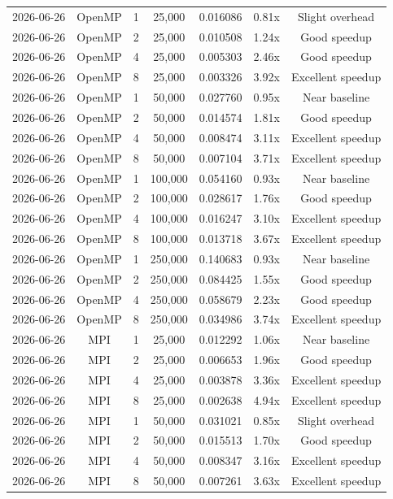 \documentclass[12pt]{article}
\begin{document}
\begin{longtable}{|c|c|c|c|c|c|c|}
2026-06-26 & OpenMP & 1 & 25,000 & 0.016086 & 0.81x & Slight overhead \\
2026-06-26 & OpenMP & 2 & 25,000 & 0.010508 & 1.24x & Good speedup \\
2026-06-26 & OpenMP & 4 & 25,000 & 0.005303 & 2.46x & Good speedup \\
2026-06-26 & OpenMP & 8 & 25,000 & 0.003326 & 3.92x & Excellent speedup \\
2026-06-26 & OpenMP & 1 & 50,000 & 0.027760 & 0.95x & Near baseline \\
2026-06-26 & OpenMP & 2 & 50,000 & 0.014574 & 1.81x & Good speedup \\
2026-06-26 & OpenMP & 4 & 50,000 & 0.008474 & 3.11x & Excellent speedup \\
2026-06-26 & OpenMP & 8 & 50,000 & 0.007104 & 3.71x & Excellent speedup \\
2026-06-26 & OpenMP & 1 & 100,000 & 0.054160 & 0.93x & Near baseline \\
2026-06-26 & OpenMP & 2 & 100,000 & 0.028617 & 1.76x & Good speedup \\
2026-06-26 & OpenMP & 4 & 100,000 & 0.016247 & 3.10x & Excellent speedup \\
2026-06-26 & OpenMP & 8 & 100,000 & 0.013718 & 3.67x & Excellent speedup \\
2026-06-26 & OpenMP & 1 & 250,000 & 0.140683 & 0.93x & Near baseline \\
2026-06-26 & OpenMP & 2 & 250,000 & 0.084425 & 1.55x & Good speedup \\
2026-06-26 & OpenMP & 4 & 250,000 & 0.058679 & 2.23x & Good speedup \\
2026-06-26 & OpenMP & 8 & 250,000 & 0.034986 & 3.74x & Excellent speedup \\
2026-06-26 & MPI & 1 & 25,000 & 0.012292 & 1.06x & Near baseline \\
2026-06-26 & MPI & 2 & 25,000 & 0.006653 & 1.96x & Good speedup \\
2026-06-26 & MPI & 4 & 25,000 & 0.003878 & 3.36x & Excellent speedup \\
2026-06-26 & MPI & 8 & 25,000 & 0.002638 & 4.94x & Excellent speedup \\
2026-06-26 & MPI & 1 & 50,000 & 0.031021 & 0.85x & Slight overhead \\
2026-06-26 & MPI & 2 & 50,000 & 0.015513 & 1.70x & Good speedup \\
2026-06-26 & MPI & 4 & 50,000 & 0.008347 & 3.16x & Excellent speedup \\
2026-06-26 & MPI & 8 & 50,000 & 0.007261 & 3.63x & Excellent speedup \\

\end{longtable}
\end{document}
